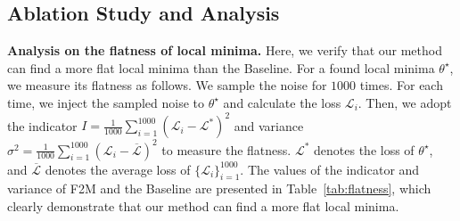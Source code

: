 \documentclass{article}
\begin{document}
\subsection{Ablation Study and Analysis} \label{subsec:ablation}
\begin{table*}[t]
\renewcommand\arraystretch{1.0}
\caption{Comparison of the flatness of the local minima found by the Baseline and our F2M.} 
\label{tab:flatness}
\centering
{}
\end{table*} 
\textbf{Analysis on the flatness of local minima.} Here, we verify that our method can find a more flat local minima than the Baseline. For a found local minima $\theta^\star$, we measure its flatness as follows. We sample the noise for $1000$ times. For each time, we inject the sampled noise to $\theta^\star$ and calculate the loss $\mathcal{L}_i$. Then, we adopt the indicator $I=\frac{1}{1000}\sum_{i=1}^{1000}(\mathcal{L}_i-\mathcal{L}^{*})^2$ and variance $\sigma^2 = \frac{1}{1000}\sum_{i=1}^{1000}(\mathcal{L}_i-\overline{\mathcal{L}})^2$ to measure the flatness. $\mathcal{L}^{*}$ denotes the loss of $\theta^\star$, and $\overline{\mathcal{L}}$ denotes the average loss of $\{\mathcal{L}_i\}_{i=1}^{1000}$. The values of the indicator and variance of F2M and the Baseline are presented in Table~\ref{tab:flatness}, which clearly demonstrate that our method can find a more flat local minima. 
\end{document}
